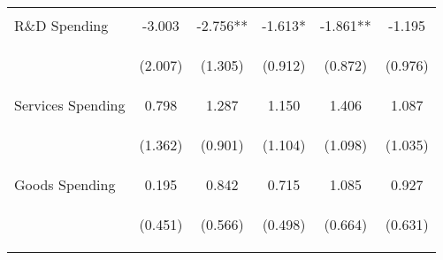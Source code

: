 \begin{tabular}{lccccc}
    \vspace{-1.5pt} & \vspace{-1.5pt} & \vspace{-1.5pt} & \vspace{-1.5pt} & \vspace{-1.5pt} \\
    R\&D Spending & -3.003 & -2.756** & -1.613* & -1.861** & -1.195 \\
    & \begin{footnotesize}(2.007)\end{footnotesize} & \begin{footnotesize}(1.305)\end{footnotesize} & \begin{footnotesize}(0.912)\end{footnotesize} & \begin{footnotesize}(0.872)\end{footnotesize} & \begin{footnotesize}(0.976)\end{footnotesize} \\
    Services Spending & 0.798 & 1.287 & 1.150 & 1.406 & 1.087 \\
    & \begin{footnotesize}(1.362)\end{footnotesize} & \begin{footnotesize}(0.901)\end{footnotesize} & \begin{footnotesize}(1.104)\end{footnotesize} & \begin{footnotesize}(1.098)\end{footnotesize} & \begin{footnotesize}(1.035)\end{footnotesize} \\
    Goods Spending & 0.195 & 0.842 & 0.715 & 1.085 & 0.927 \\
    & \begin{footnotesize}(0.451)\end{footnotesize} & \begin{footnotesize}(0.566)\end{footnotesize} & \begin{footnotesize}(0.498)\end{footnotesize} & \begin{footnotesize}(0.664)\end{footnotesize} & \begin{footnotesize}(0.631)\end{footnotesize} \\


\end{tabular}
